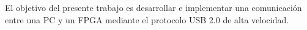 El objetivo del presente trabajo es desarrollar e implementar una comunicación entre una PC y un FPGA mediante el protocolo USB 2.0 de alta velocidad.\\

